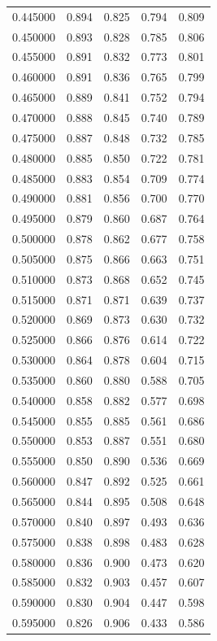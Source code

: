 \begin{table}[htbp]
\begin{tabular}{lllll}
0.445000 & 0.894 & 0.825 & 0.794 & 0.809 \\
0.450000 & 0.893 & 0.828 & 0.785 & 0.806 \\
0.455000 & 0.891 & 0.832 & 0.773 & 0.801 \\
0.460000 & 0.891 & 0.836 & 0.765 & 0.799 \\
0.465000 & 0.889 & 0.841 & 0.752 & 0.794 \\
0.470000 & 0.888 & 0.845 & 0.740 & 0.789 \\
0.475000 & 0.887 & 0.848 & 0.732 & 0.785 \\
0.480000 & 0.885 & 0.850 & 0.722 & 0.781 \\
0.485000 & 0.883 & 0.854 & 0.709 & 0.774 \\
0.490000 & 0.881 & 0.856 & 0.700 & 0.770 \\
0.495000 & 0.879 & 0.860 & 0.687 & 0.764 \\
0.500000 & 0.878 & 0.862 & 0.677 & 0.758 \\
0.505000 & 0.875 & 0.866 & 0.663 & 0.751 \\
0.510000 & 0.873 & 0.868 & 0.652 & 0.745 \\
0.515000 & 0.871 & 0.871 & 0.639 & 0.737 \\
0.520000 & 0.869 & 0.873 & 0.630 & 0.732 \\
0.525000 & 0.866 & 0.876 & 0.614 & 0.722 \\
0.530000 & 0.864 & 0.878 & 0.604 & 0.715 \\
0.535000 & 0.860 & 0.880 & 0.588 & 0.705 \\
0.540000 & 0.858 & 0.882 & 0.577 & 0.698 \\
0.545000 & 0.855 & 0.885 & 0.561 & 0.686 \\
0.550000 & 0.853 & 0.887 & 0.551 & 0.680 \\
0.555000 & 0.850 & 0.890 & 0.536 & 0.669 \\
0.560000 & 0.847 & 0.892 & 0.525 & 0.661 \\
0.565000 & 0.844 & 0.895 & 0.508 & 0.648 \\
0.570000 & 0.840 & 0.897 & 0.493 & 0.636 \\
0.575000 & 0.838 & 0.898 & 0.483 & 0.628 \\
0.580000 & 0.836 & 0.900 & 0.473 & 0.620 \\
0.585000 & 0.832 & 0.903 & 0.457 & 0.607 \\
0.590000 & 0.830 & 0.904 & 0.447 & 0.598 \\
0.595000 & 0.826 & 0.906 & 0.433 & 0.586 \\

\end{tabular}
\end{table}
